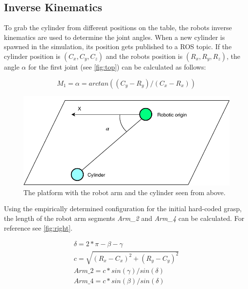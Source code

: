 \subsection{Inverse Kinematics}
To grab the cylinder from different positions on the table, the robots inverse kinematics are used to determine the joint angles.
When a new cylinder is spawned in the simulation, its position gets published to a ROS topic.
If the cylinder position is $(C_x, C_y, C_z)$ and the robots position is $(R_x, R_y, R_z)$, the angle $\alpha$ for the first joint (see \autoref{fig:top}) can be calculated as follows:

\begin{equation}
\label{simple_equation}
M_1=\alpha = arctan((C_y-R_y)/(C_x-R_x))
\end{equation}

\begin{figure}[htpb]
\centering
	\includegraphics[width=0.96\linewidth]{figures/top_view.pdf} 
	\caption{The platform with the robot arm and the cylinder seen from above.}
	\vspace{-0.4cm}
	\label{fig:top}
\end{figure}

Using the empirically determined configuration for the initial hard-coded grasp, the length of the robot arm segments \textit{Arm\_2} and \textit{Arm\_4} can be calculated.
For reference see \autoref{fig:right}.

\begin{equation}
\begin{aligned}
\delta=2*\pi-\beta-\gamma\\
c=\sqrt{(R_x-C_x)^2+(R_y-C_y)^2}\\
\textit{Arm\_2}=c*sin(\gamma)/sin(\delta)\\
\textit{Arm\_4}=c*sin(\beta)/sin(\delta)\\
\end{aligned}
\end{equation}


